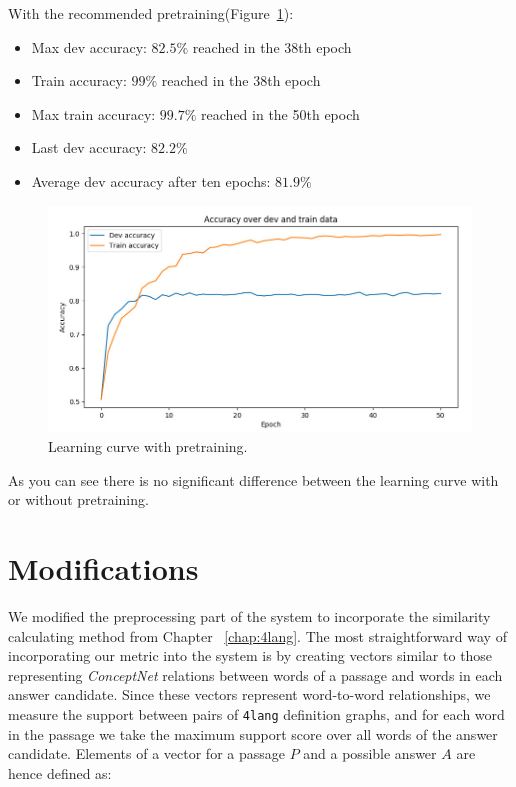 \begin{minipage}{\linewidth}
With the recommended pretraining(Figure~\ref{fig:learning_curve2}):
\begin{itemize}
	\item Max dev accuracy: $82.5\%$ reached in the 38th epoch
	\item Train accuracy: $99\%$ reached in the 38th epoch
	\item Max train accuracy: $99.7\%$ reached in the 50th epoch
	\item Last dev accuracy: $82.2\%$
	\item Average dev accuracy after ten epochs: $81.9\%$
\end{itemize}
\end{minipage}
\begin{figure}[!htb]
	\centering
	\includegraphics[scale=0.5]{learning_curve2.jpg}
	\caption{Learning curve with pretraining.}
	\label{fig:learning_curve2}
\end{figure}

As you can see there is no significant difference between the learning curve with or without pretraining.

\section{Modifications}
We modified the preprocessing part of the system to incorporate the similarity calculating method from Chapter ~\ref{chap:4lang}. The most straightforward way of incorporating our metric into the system is by creating vectors similar to those representing \textit{ConceptNet} relations between words of a passage and words in each answer candidate. Since these vectors represent
word-to-word relationships, we measure the support between pairs of \texttt{4lang} definition graphs, and for each word in the passage we take the maximum support score over all words of the answer candidate. Elements of a vector for a passage $P$ and a possible answer $A$ are hence defined as:

